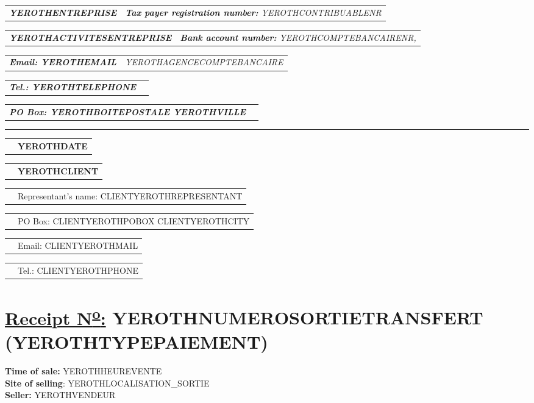 \documentclass[11pt,YEROTHPAPERSPEC]{article} %
\makeatletter
\newcommand{\headerrow}[2]
{\begin{tabular*}{\linewidth}{l@{\extracolsep{\fill}}r}
	#1 &
	#2 \\
\end{tabular*}}
\newcommand{\emphbold}[1]{\textbf{\emph{#1}}\xspace}
\makeatother
\begin{document}
\bigskip

\headerrow
	{\emphbold{YEROTHENTREPRISE}}
	{\emph{\textbf{Tax payer registration number:} YEROTHCONTRIBUABLENR}}
\headerrow
	{\emphbold{YEROTHACTIVITESENTREPRISE}}
	{\emph{\textbf{Bank account number:} YEROTHCOMPTEBANCAIRENR,}}
\headerrow
	{\emphbold{Email: YEROTHEMAIL}}
	{\emph{YEROTHAGENCECOMPTEBANCAIRE}}
\headerrow
	{\emphbold{Tel.: YEROTHTELEPHONE}}
	{}
\headerrow
	{\emphbold{PO Box: YEROTHBOITEPOSTALE YEROTHVILLE}}
	{}
	
\hrule

\headerrow
	{}
	{\textbf{YEROTHDATE}}

\vspace*{0.9cm}

\headerrow
{}
{\textbf{YEROTHCLIENT}}
\headerrow
{}
{Representant's name: CLIENTYEROTHREPRESENTANT}
\headerrow
{}
{PO Box: CLIENTYEROTHPOBOX CLIENTYEROTHCITY}
\headerrow
{}
{Email: CLIENTYEROTHMAIL}
\headerrow
{}
{Tel.: CLIENTYEROTHPHONE}

\section*{\underline{Receipt N\textsuperscript{\underline{o}}:} YEROTHNUMEROSORTIETRANSFERT (YEROTHTYPEPAIEMENT)}
\textbf{Time of sale:} YEROTHHEUREVENTE\\
\textbf{Site of selling}: YEROTHLOCALISATION_SORTIE\\
\textbf{Seller:} YEROTHVENDEUR

\vspace{0.3cm} 
\end{document}
